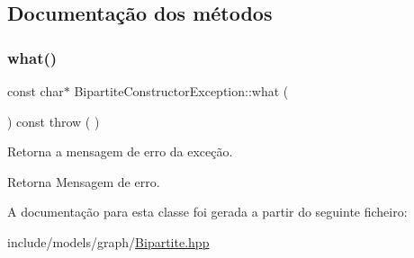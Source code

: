 \subsection{Documentação dos métodos}
\mbox{\label{classBipartiteConstructorException_a11f033387020957b5ccd952914475807}} 
\subsubsection{\texorpdfstring{what()}{what()}}
{\footnotesize\ttfamily const char$\ast$ Bipartite\+Constructor\+Exception\+::what (\begin{DoxyParamCaption}{ }\end{DoxyParamCaption}) const throw ( ) \hspace{0.3cm}{\ttfamily [inline]}}

Retorna a mensagem de erro da exceção. \begin{DoxyReturn}{Retorna}
Mensagem de erro. 
\end{DoxyReturn}


A documentação para esta classe foi gerada a partir do seguinte ficheiro\+:\begin{DoxyCompactItemize}
\item 
include/models/graph/\mbox{\hyperlink{Bipartite_8hpp}{Bipartite.\+hpp}}\end{DoxyCompactItemize}
